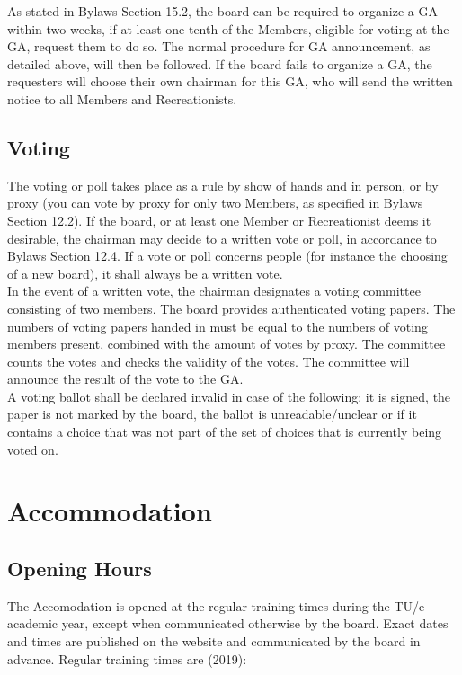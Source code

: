 \documentclass[a4paper]{article}
\newcommand{\Asta}{Bylaws} %
\begin{document}
As stated in { \Asta} Section 15.2, the board can be required to organize a { GA} within two weeks, if at least one tenth of the { Members}, eligible for voting at the { GA}, request them to do so. The normal procedure for { GA} announcement, as detailed above, will then be followed. If the board fails to organize a { GA}, the requesters will choose their own chairman for this { GA}, who will send the written notice to all { Members} and { Recreationists}. \\

\subsection{Voting}
The voting or poll takes place as a rule by show of hands and in person, or by proxy (you can vote by proxy for only two { Members}, as specified in { \Asta} Section 12.2). If the board, or at least one { Member} or { Recreationist} deems it desirable, the chairman may decide to a written vote or poll, in accordance to { \Asta} Section 12.4. If a vote or poll concerns people (for instance the choosing of a new board), it shall always be a written vote. \\ 

In the event of a written vote, the chairman designates a voting committee consisting of two members. The board provides authenticated voting papers. The numbers of voting papers handed in must be equal to the numbers of voting members present, combined with the amount of votes by proxy. The committee counts the votes and checks the validity of the votes. The committee will announce the result of the vote to the { GA}. \\

A voting ballot shall be declared invalid in case of the following: it is signed, the paper is not marked by the board, the ballot is unreadable/unclear or if it contains a choice that was not part of the set of choices that is currently being voted on.

\section{Accommodation}
\subsection{Opening Hours}
\label{section:opening}
The { Accomodation} is opened at the regular training times during the { TU/e} academic year, except when communicated otherwise by the board. Exact dates and times are published on the website and communicated by the board in advance. Regular training times are {\g (2019)}: \\
\end{document}

